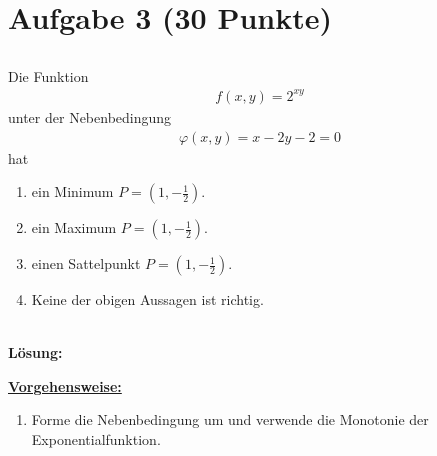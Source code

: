 \section*{Aufgabe 3 (30 Punkte)}
\vspace{0.4cm}
\subsection*{}
Die Funktion
\begin{align*}
	f(x,y) = 2^{xy}
\end{align*}
unter der Nebenbedingung
\begin{align*}
	\varphi(x,y)
	=
	x - 2 y - 2
	= 
	0
\end{align*}
hat
\renewcommand{\labelenumi}{(\alph{enumi})}
\begin{enumerate}
	\item 
	ein Minimum $ P = \left(1,-\frac{1}{2} \right) $.
	\item
	ein Maximum $ P = \left(1,-\frac{1}{2} \right) $.
	\item
	einen Sattelpunkt $ P = \left(1,-\frac{1}{2} \right) $.
	\item 
	Keine der obigen Aussagen ist richtig.
\end{enumerate}
\ \\
\textbf{Lösung:}
\begin{mdframed}
\underline{\textbf{Vorgehensweise:}}
\renewcommand{\labelenumi}{\theenumi.}
\begin{enumerate}
\item Forme die Nebenbedingung um und verwende die Monotonie der Exponentialfunktion.
\end{enumerate}
\end{mdframed}

